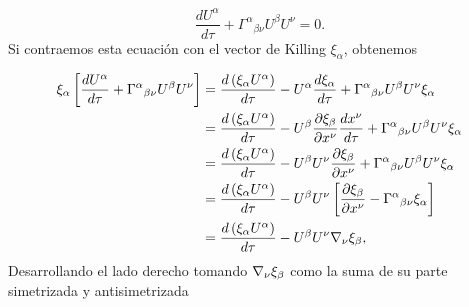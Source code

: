 \begin{equation}
    \frac{d U^\alpha}{d \tau}+\Gamma^\alpha{ }_{\beta \nu} U^\beta U^\nu=0 .
    \label{eq:geodesicaU}
\end{equation}
Si contraemos esta ecuación con el vector de Killing $\xi_\alpha$, obtenemos

\begin{equation}
    \begin{aligned}
        \xi_\alpha\left[\frac{d U^\alpha}{d \tau}+\Gamma^\alpha{ }_{\beta \nu} U^\beta U^\nu\right] & = \frac{d \left(\xi_\alpha U^\alpha\right)}{d  \tau}-U^\alpha \frac{d \xi_\alpha}{d \tau}+\Gamma^\alpha{ }_{\beta \nu} U^\beta U^\nu \xi_\alpha                                         \\
                                                                                                    & = \frac{d \left(\xi_\alpha U^\alpha\right)}{d  \tau} - U^\beta \frac{\partial \xi_\beta}{\partial x^\nu} \frac{d x^\nu}{d \tau} + \Gamma^\alpha{ }_{\beta \nu} U^\beta U^\nu \xi_\alpha \\
                                                                                                    & = \frac{d \left(\xi_\alpha U^\alpha\right)}{d  \tau} - U^\beta U^\nu \frac{\partial \xi_\beta}{\partial x^\nu} + \Gamma^\alpha{ }_{\beta \nu} U^\beta U^\nu \xi_\alpha                  \\
                                                                                                    & = \frac{d \left(\xi_\alpha U^\alpha\right)}{d  \tau} - U^\beta U^\nu \left[ \frac{\partial \xi_\beta}{\partial x^\nu} - \Gamma^\alpha{ }_{\beta \nu}  \xi_\alpha \right]                \\
                                                                                                    & = \frac{d \left(\xi_\alpha U^\alpha\right)}{d  \tau} - U^\beta U^\nu \mathbf{\nabla}_\nu \xi_\beta ,                                                                                         \\
    \end{aligned}
\end{equation}
Desarrollando el lado derecho tomando
$\mathbf{\nabla}_\nu \xi_\beta $ como la suma de su parte simetrizada y antisimetrizada
